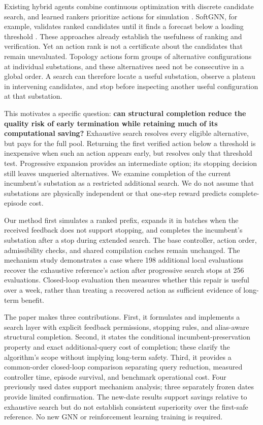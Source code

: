 \documentclass[letterpaper]{article}
\begin{document}
Existing hybrid agents combine continuous optimization with discrete candidate search, and learned rankers prioritize actions for simulation \citep{ljn2023agent,hassouna2025softgnn,dejong2025generalizablev1}. SoftGNN, for example, validates ranked candidates until it finds a forecast below a loading threshold \citep{hassouna2025softgnn}. These approaches already establish the usefulness of ranking and verification. Yet an action rank is not a certificate about the candidates that remain unevaluated. Topology actions form groups of alternative configurations at individual substations, and these alternatives need not be consecutive in a global order. A search can therefore locate a useful substation, observe a plateau in intervening candidates, and stop before inspecting another useful configuration at that substation.


This motivates a specific question: \textbf{can structural completion reduce the quality risk of early termination while retaining much of its computational saving?} Exhaustive search resolves every eligible alternative, but pays for the full pool. Returning the first verified action below a threshold is inexpensive when such an action appears early, but resolves only that threshold test. Progressive expansion provides an intermediate option; its stopping decision still leaves unqueried alternatives. We examine completion of the current incumbent's substation as a restricted additional search. We do not assume that substations are physically independent or that one-step reward predicts complete-episode cost.


Our method first simulates a ranked prefix, expands it in batches when the received feedback does not support stopping, and completes the incumbent's substation after a stop during extended search. The base controller, action order, admissibility checks, and shared compilation caches remain unchanged. The mechanism study demonstrates a case where 198 additional local evaluations recover the exhaustive reference's action after progressive search stops at 256 evaluations. Closed-loop evaluation then measures whether this repair is useful over a week, rather than treating a recovered action as sufficient evidence of long-term benefit.


The paper makes three contributions. First, it formulates and implements a search layer with explicit feedback permissions, stopping rules, and alias-aware structural completion. Second, it states the conditional incumbent-preservation property and exact additional-query cost of completion; these clarify the algorithm's scope without implying long-term safety. Third, it provides a common-order closed-loop comparison separating query reduction, measured controller time, episode survival, and benchmark operational cost. Four previously used dates support mechanism analysis; three separately frozen dates provide limited confirmation. The new-date results support savings relative to exhaustive search but do not establish consistent superiority over the first-safe reference. No new GNN or reinforcement learning training is required.
\end{document}
